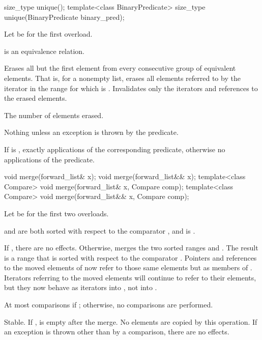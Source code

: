 %
\begin{itemdecl}
size_type unique();
template<class BinaryPredicate> size_type unique(BinaryPredicate binary_pred);
\end{itemdecl}

\begin{itemdescr}
\pnum
Let  be  for the first overload.

\pnum
\expects
{} is an equivalence relation.

\pnum
\effects
Erases all but the first element from every consecutive
group of equivalent elements.
That is, for a nonempty list, erases all elements referred to
by the iterator  in the range 
for which  is .
Invalidates only the iterators and references to the erased elements.

\pnum
\returns
The number of elements erased.

\pnum
\throws
Nothing unless an exception is thrown by the predicate.

\pnum
\complexity
If  is ,
exactly  applications of
the corresponding predicate,
otherwise no applications of the predicate.
\end{itemdescr}

%
\begin{itemdecl}
void merge(forward_list& x);
void merge(forward_list&& x);
template<class Compare> void merge(forward_list& x, Compare comp);
template<class Compare> void merge(forward_list&& x, Compare comp);
\end{itemdecl}

\begin{itemdescr}
\pnum
Let  be  for the first two overloads.

\pnum
\expects
{} and  are both sorted
with respect to the comparator , and
 is .

\pnum
\effects
If , there are no effects.
Otherwise, merges
the two sorted ranges  and .
The result is a range
that is sorted with respect to the comparator .
Pointers and references to the moved elements of  now refer to those same elements
but as members of . Iterators referring to the moved elements will continue to
refer to their elements, but they now behave as iterators into , not into
.

\pnum
\complexity
At most  comparisons
if ; otherwise, no comparisons are performed.

\pnum
\remarks
Stable.
If ,  is empty after the merge.
No elements are copied by this operation.
If an exception is thrown other than by a comparison, there are no effects.
\end{itemdescr}


